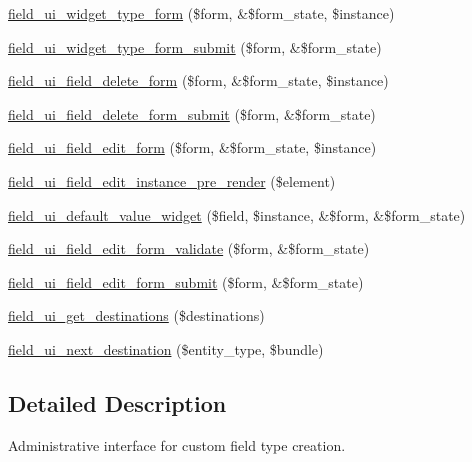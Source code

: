 \begin{DoxyCompactItemize}
\hyperlink{group__forms_ga4dda66fe912ff3d86613df64b4a940e0}{field\_\-ui\_\-widget\_\-type\_\-form} (\$form, \&\$form\_\-state, \$instance)
\item 
\hyperlink{field__ui_8admin_8inc_a0e5ede7769ff7c3d89a90096f0390c35}{field\_\-ui\_\-widget\_\-type\_\-form\_\-submit} (\$form, \&\$form\_\-state)
\item 
\hyperlink{group__forms_gaaf4ce327f76bcd961e5de338558e704e}{field\_\-ui\_\-field\_\-delete\_\-form} (\$form, \&\$form\_\-state, \$instance)
\item 
\hyperlink{field__ui_8admin_8inc_a643ce47fcd5a52d15e79734b946da76e}{field\_\-ui\_\-field\_\-delete\_\-form\_\-submit} (\$form, \&\$form\_\-state)
\item 
\hyperlink{group__forms_ga11660e91b3649ff30bf665c00f1a9af2}{field\_\-ui\_\-field\_\-edit\_\-form} (\$form, \&\$form\_\-state, \$instance)
\item 
\hyperlink{field__ui_8admin_8inc_a373285bb6132ddc8934b459d5fe70f7e}{field\_\-ui\_\-field\_\-edit\_\-instance\_\-pre\_\-render} (\$element)
\item 
\hyperlink{field__ui_8admin_8inc_a2f64b5b1584120d25be152298d7d422f}{field\_\-ui\_\-default\_\-value\_\-widget} (\$field, \$instance, \&\$form, \&\$form\_\-state)
\item 
\hyperlink{field__ui_8admin_8inc_ae9379c6d84a3dcf100c967a8a0a0f233}{field\_\-ui\_\-field\_\-edit\_\-form\_\-validate} (\$form, \&\$form\_\-state)
\item 
\hyperlink{field__ui_8admin_8inc_a0d4cacca76203d4d7506dedc4781018e}{field\_\-ui\_\-field\_\-edit\_\-form\_\-submit} (\$form, \&\$form\_\-state)
\item 
\hyperlink{field__ui_8admin_8inc_a8fdd890b48694b7632b438460c5bd5d5}{field\_\-ui\_\-get\_\-destinations} (\$destinations)
\item 
\hyperlink{field__ui_8admin_8inc_ae2e29e187f0b5b94977a59e32a825dd7}{field\_\-ui\_\-next\_\-destination} (\$entity\_\-type, \$bundle)
\end{DoxyCompactItemize}


\subsection{Detailed Description}
Administrative interface for custom field type creation. 


